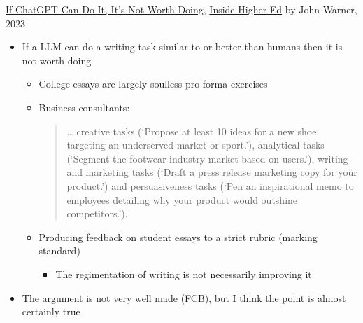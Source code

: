\documentclass[25pt,a4paper,landscape,headrule,footrule,xetex]{foils}
\begin{document}
\href{https://www.insidehighered.com/opinion/blogs/just-visiting/2023/09/20/chatgpt-shows-way-toward-our-own-humanity}{If ChatGPT Can Do It, It’s Not Worth Doing}, 
\href{https://www.insidehighered.com/}{Inside Higher Ed} by  John Warner,  2023

\begin{itemize}
\item If a LLM can do a writing task similar to or better than humans
  then it is not worth doing
  \begin{itemize}
  \item College essays are largely soulless pro forma exercises
  \item Business consultants:
    \begin{quote}
      … creative tasks (‘Propose at least 10 ideas for a new shoe targeting an underserved market or sport.’), analytical tasks (‘Segment the footwear industry market based on users.’), writing and marketing tasks (‘Draft a press release marketing copy for your product.’) and persuasiveness tasks (‘Pen an inspirational memo to employees detailing why your product would outshine competitors.’).
    \end{quote}
    
  \item Producing feedback on student essays to a strict rubric
    (marking standard)
    \begin{itemize}
    \item The regimentation of writing is not necessarily improving it
    \end{itemize}
  \end{itemize}
\item The argument is not very well made (FCB), but I think the point is almost certainly true
\end{itemize}


\end{document}
